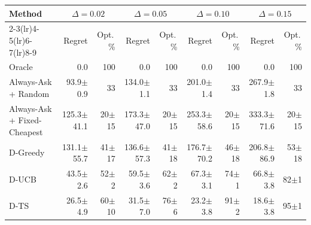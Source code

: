 \begin{tabular}{lrrrrrrrr}
\toprule
Method & \multicolumn{2}{c}{$\Delta=0.02$} & \multicolumn{2}{c}{$\Delta=0.05$} & \multicolumn{2}{c}{$\Delta=0.10$} & \multicolumn{2}{c}{$\Delta=0.15$} \\
\cmidrule(lr){2-3}\cmidrule(lr){4-5}\cmidrule(lr){6-7}\cmidrule(lr){8-9}
 & Regret & Opt.\,\% & Regret & Opt.\,\% & Regret & Opt.\,\% & Regret & Opt.\,\% \\
\midrule
Oracle & 0.0 & 100 & 0.0 & 100 & 0.0 & 100 & 0.0 & 100 \\
Always-Ask + Random & 93.9{\scriptsize$\pm$0.9} & 33 & 134.0{\scriptsize$\pm$1.1} & 33 & 201.0{\scriptsize$\pm$1.4} & 33 & 267.9{\scriptsize$\pm$1.8} & 33 \\
Always-Ask + Fixed-Cheapest & 125.3{\scriptsize$\pm$41.1} & 20{\scriptsize$\pm$15} & 173.3{\scriptsize$\pm$47.0} & 20{\scriptsize$\pm$15} & 253.3{\scriptsize$\pm$58.6} & 20{\scriptsize$\pm$15} & 333.3{\scriptsize$\pm$71.6} & 20{\scriptsize$\pm$15} \\
D-Greedy & 131.1{\scriptsize$\pm$55.7} & 41{\scriptsize$\pm$17} & 136.6{\scriptsize$\pm$57.3} & 41{\scriptsize$\pm$18} & 176.7{\scriptsize$\pm$70.2} & 46{\scriptsize$\pm$18} & 206.8{\scriptsize$\pm$86.9} & 53{\scriptsize$\pm$18} \\
D-UCB & 43.5{\scriptsize$\pm$2.6} & 52{\scriptsize$\pm$2} & 59.5{\scriptsize$\pm$3.6} & 62{\scriptsize$\pm$2} & 67.3{\scriptsize$\pm$3.1} & 74{\scriptsize$\pm$1} & 66.8{\scriptsize$\pm$3.8} & 82{\scriptsize$\pm$1} \\
D-TS & 26.5{\scriptsize$\pm$4.9} & 60{\scriptsize$\pm$10} & 31.5{\scriptsize$\pm$7.0} & 76{\scriptsize$\pm$6} & 23.2{\scriptsize$\pm$3.8} & 91{\scriptsize$\pm$2} & 18.6{\scriptsize$\pm$3.8} & 95{\scriptsize$\pm$1} \\
\bottomrule
\end{tabular}
